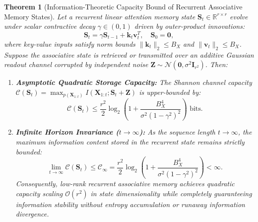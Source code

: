 \documentclass[journal]{IEEEtran}
\newtheorem{theorem}{Theorem}
\begin{document}
\begin{theorem}[Information-Theoretic Capacity Bound of Recurrent Associative Memory States]
\label{thm:information_capacity_bound}
Let a recurrent linear attention memory state $\mathbf{S}_t \in \mathbb{R}^{r \times r}$ evolve under scalar contractive decay $\gamma \in (0, 1)$ driven by outer-product innovations:
\begin{equation}
\mathbf{S}_t = \gamma \mathbf{S}_{t-1} + \mathbf{k}_t \mathbf{v}_t^T, \quad \mathbf{S}_0 = \mathbf{0},
\end{equation}
where key-value inputs satisfy norm bounds $\|\mathbf{k}_t\|_2 \le B_X$ and $\|\mathbf{v}_t\|_2 \le B_X$.
Suppose the associative state is retrieved or transmitted over an additive Gaussian readout channel corrupted by independent noise $\mathbf{Z} \sim \mathcal{N}(\mathbf{0}, \sigma^2 \mathbf{I}_{r^2})$.
Then:
\begin{enumerate}
    \item \textbf{Asymptotic Quadratic Storage Capacity:} The Shannon channel capacity $\mathcal{C}(\mathbf{S}_t) = \max_{p(\mathbf{X}_{1:t})} I(\mathbf{X}_{1:t}; \mathbf{S}_t + \mathbf{Z})$ is upper-bounded by:
    \begin{equation}
    \mathcal{C}(\mathbf{S}_t) \le \frac{r^2}{2} \log_2\left( 1 + \frac{B_X^4}{\sigma^2 (1 - \gamma^2)^2} \right) \text{ bits}.
    \end{equation}
    \item \textbf{Infinite Horizon Invariance ($t \to \infty$):} As the sequence length $t \to \infty$, the maximum information content stored in the recurrent state remains strictly bounded:
    \begin{equation}
    \lim_{t \to \infty} \mathcal{C}(\mathbf{S}_t) \le \mathcal{C}_\infty = \frac{r^2}{2} \log_2\left( 1 + \frac{B_X^4}{\sigma^2 (1 - \gamma^2)^2} \right) < \infty.
    \end{equation}
    Consequently, low-rank recurrent associative memory achieves quadratic capacity scaling $\mathcal{O}(r^2)$ in state dimensionality while completely guaranteeing information stability without entropy accumulation or runaway information divergence.
\end{enumerate}
\end{theorem}
\end{document}
